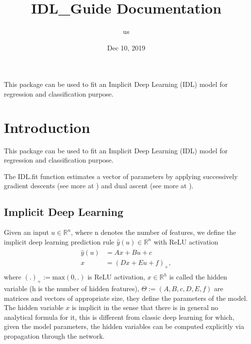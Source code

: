 \documentclass[letterpaper,10pt,english]{sphinxmanual}
\title{IDL\_Guide Documentation}
\date{Dec 10, 2019}
\author{us}
\begin{document}
\pagestyle{empty}
\sphinxmaketitle
\pagestyle{plain}
\sphinxtableofcontents
\pagestyle{normal}
\label{\detokenize{index::doc}}


This package can be used to fit an Implicit Deep Learning (IDL)
model for regression and classification purpose.


\chapter{Introduction}
\label{\detokenize{sections/introduction:introduction}}\label{\detokenize{sections/introduction::doc}}
This package can be used to fit an Implicit Deep Learning (IDL) model for regression
and classification purpose.

The IDL.fit function estimates a vector of parameters by applying successively
gradient descents (see more at {\hyperref[\detokenize{sections/gradient_descents:gradient-descents}]{}}) and dual ascent
(see more at {\hyperref[\detokenize{sections/dual_ascents:dual-ascents}]{}}).


\section{Implicit Deep Learning}
\label{\detokenize{sections/introduction:id1}}
Given an input \(u \in \mathbb{R}^n\), where n denotes the number of features,
we define the implicit deep learning prediction rule \(\hat{y}(u) \in \mathbb{R}^n\) with ReLU activation
\begin{equation}\label{equation:sections/introduction:eq_1}
\begin{split}\begin{align}
    \hat{y}(u) &= Ax + Bu + c \\
    x &= (Dx + Eu + f)_+,
\end{align}\end{split}
\end{equation}
where \((.)_+ := \text{max}(0,.)\) is ReLU activation, \(x \in \mathbb{R}^h\) is called the hidden variable
(h is the number of hidden features), \(\Theta := (A,B,c,D,E,f)\) are matrices and vectors of appropriate size, they define the
parameters of the model. The hidden variable \(x\) is implicit in the sense that there is in general no analytical
formula for it, this is different from classic deep learning for which, given the model parameters, the hidden
variables can be computed explicitly via propagation through the network.
\end{document}
